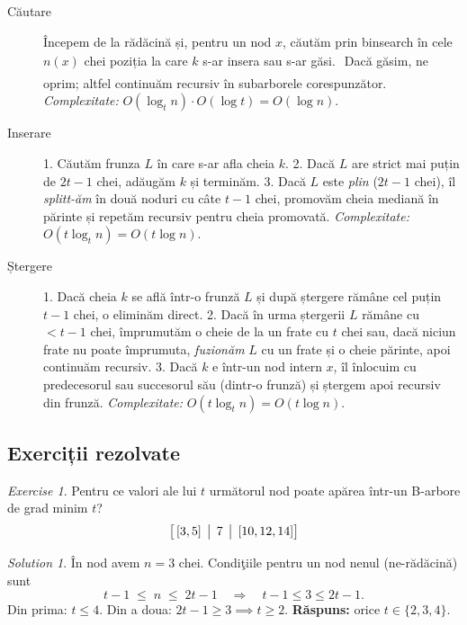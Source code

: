 \documentclass[11pt,a4paper]{article}
\theoremstyle{definition}
\theoremstyle{plain}
\theoremstyle{remark}
\newtheorem{exercise}{Exercise}[section]
\newtheorem*{solution}{Solution}
\begin{document}
\begin{description}
  \item[Căutare\:]
    Începem de la rădăcină și, pentru un nod \(x\), căutăm prin binsearch în cele \(n(x)\) chei poziția la care \(k\) s-ar insera sau s-ar găsi.
    \(\;\Bigl.\)Dacă găsim, ne oprim; altfel continuăm recursiv în subarborele corespunzător.
    \emph{Complexitate:} \(O(\log_t n)\cdot O(\log t)=O(\log n)\).
  \item[Inserare\:]
    1. Căutăm frunza \(L\) în care s-ar afla cheia \(k\).
    2. Dacă \(L\) are strict mai puțin de \(2t-1\) chei, adăugăm \(k\) și terminăm.
    3. Dacă \(L\) este \emph{plin} (\(2t-1\) chei), îl \emph{splitt-ăm} în două noduri cu câte \(t-1\) chei, promovăm cheia mediană în părinte și repetăm recursiv pentru cheia promovată.
    \emph{Complexitate:} \(O(t\log_t n)=O(t\log n)\).
  \item[Ștergere\:]
    1. Dacă cheia \(k\) se află într-o frunză \(L\) și după ștergere rămâne cel puțin \(t-1\) chei, o eliminăm direct.
    2. Dacă în urma ștergerii \(L\) rămâne cu \(<t-1\) chei, împrumutăm o cheie de la un frate cu \(t\) chei sau, dacă niciun frate nu poate împrumuta, \emph{fuzionăm} \(L\) cu un frate și o cheie părinte, apoi continuăm recursiv.
    3. Dacă \(k\) e într-un nod intern \(x\), îl înlocuim cu predecesorul sau succesorul său (dintr-o frunză) și ștergem apoi recursiv din frunză.
    \emph{Complexitate:} \(O(t\log_t n)=O(t\log n)\).
\end{description}

\subsection*{Exerciții rezolvate}

\begin{exercise}
Pentru ce valori ale lui \(t\) următorul nod poate apărea într-un B-arbore de grad minim \(t\)?
\[
\bigl[\,[3,5]\,\bigm|\,7\,\bigm|\,[10,12,14]\bigr]
\]
\end{exercise}
\begin{solution}
În nod avem \(n=3\) chei. Condiţiile pentru un nod nenul (ne-rădăcină) sunt
\[
t-1 \;\le\; n \;\le\; 2t-1
\quad\Longrightarrow\quad
t-1\le3\le2t-1.
\]
Din prima: \(t\le4\). Din a doua: \(2t-1\ge3\implies t\ge2\).
\textbf{Răspuns:} orice \(t\in\{2,3,4\}\).
\end{solution}

\vspace{1em}
\end{document}
